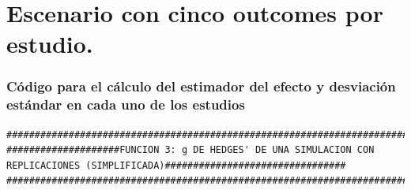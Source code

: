 \documentclass[a4paper,openright,12pt]{report}
\begin{document}
\section{Escenario con cinco outcomes por estudio.}
\subsubsection{Código para el cálculo del estimador del efecto y desviación estándar en cada uno de los estudios}
{\tiny
\begin{verbatim}
##############################################################################################################################
####################FUNCION 3: g DE HEDGES' DE UNA SIMULACION CON REPLICACIONES (SIMPLIFICADA)################################
##############################################################################################################################


\end{verbatim}}
\end{document}
